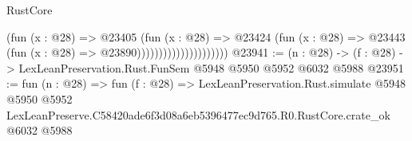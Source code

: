 \begin{lexlean}{RustCore}
\begin{coremodule}
                                      (fun (x : @28) =>
                                      @23405
                                        (fun (x : @28) =>
                                        @23424
                                          (fun (x : @28) =>
                                          @23443 (fun (x : @28) => @23890)))))))))))))))))))))
@23941 := (n : @28) -> (f : @28) -> LexLeanPreservation.Rust.FunSem @5948 @5950 @5952 @6032 @5988
@23951 := fun (n : @28) =>
  fun (f : @28) =>
  LexLeanPreservation.Rust.simulate
    @5948
    @5950
    @5952
    LexLeanPreserve.C58420ade6f3d08a6eb5396477ec9d765.R0.RustCore.crate_ok
    @6032
    @5988
\end{coremodule}
\end{lexlean}
